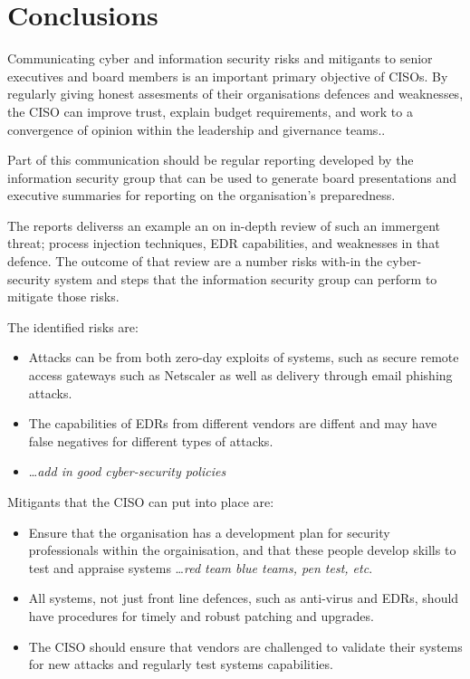 \section{Conclusions}

Communicating cyber and information security risks and mitigants to senior executives and board members is an important primary objective of CISOs.
By regularly giving honest assesments of their organisations defences and weaknesses, the CISO can improve trust, explain budget requirements, and work to a convergence of opinion within the
leadership and givernance teams..

Part of this communication should be regular reporting developed by the information security group that can be used to generate board presentations and executive summaries for reporting on the
organisation's preparedness.

The reports deliverss an example an on in-depth review of such an immergent threat; process injection techniques, EDR capabilities, and weaknesses in that defence.  The outcome of that review are
a number risks with-in the cyber-security system and  steps that the information security group can perform to mitigate those risks.

The identified risks are:
\begin{itemize}
\item Attacks can be from both zero-day exploits of systems, such as secure remote access gateways such as Netscaler as well as delivery through email phishing attacks.
\item The capabilities of EDRs from different vendors are diffent and may have false negatives for different types of attacks.
\item \ldots \textit{add in good cyber-security policies}
\end{itemize}

Mitigants that the CISO can put into place are:
\begin{itemize}
\item Ensure that the organisation has a development plan for security professionals within the orgainisation, and that these people develop skills to test and appraise systems \ldots \textit{red team blue teams, pen test, etc}.
\item  All systems, not just front line defences, such as anti-virus and EDRs, should have procedures for timely and robust patching and upgrades.
\item The CISO should ensure that vendors are challenged to  validate their systems for new attacks and regularly test systems capabilities. 
\end{itemize}